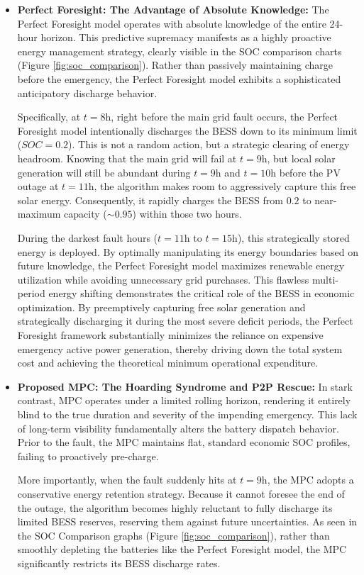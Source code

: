 \begin{itemize}
    \item \textbf{Perfect Foresight: The Advantage of Absolute Knowledge:}
The Perfect Foresight model operates with absolute knowledge of the entire 24-hour horizon. This predictive supremacy manifests as a highly proactive energy management strategy, clearly visible in the SOC comparison charts (Figure \ref{fig:soc_comparison}). Rather than passively maintaining charge before the emergency, the Perfect Foresight model exhibits a sophisticated anticipatory discharge behavior. 

Specifically, at $t=8\text{h}$, right before the main grid fault occurs, the Perfect Foresight model intentionally discharges the BESS down to its minimum limit ($SOC = 0.2$). This is not a random action, but a strategic clearing of energy headroom. Knowing that the main grid will fail at $t=9\text{h}$, but local solar generation will still be abundant during $t=9\text{h}$ and $t=10\text{h}$ before the PV outage at $t=11\text{h}$, the algorithm makes room to aggressively capture this free solar energy. Consequently, it rapidly charges the BESS from $0.2$ to near-maximum capacity ($\sim 0.95$) within those two hours.

During the darkest fault hours ($t=11\text{h}$ to $t=15\text{h}$), this strategically stored energy is deployed. By optimally manipulating its energy boundaries based on future knowledge, the Perfect Foresight model maximizes renewable energy utilization while avoiding unnecessary grid purchases. This flawless multi-period energy shifting demonstrates the critical role of the BESS in economic optimization. By preemptively capturing free solar generation and strategically discharging it during the most severe deficit periods, the Perfect Foresight framework substantially minimizes the reliance on expensive emergency active power generation, thereby driving down the total system cost and achieving the theoretical minimum operational expenditure.

    \item \textbf{Proposed MPC: The Hoarding Syndrome and P2P Rescue:}
In stark contrast, MPC operates under a limited rolling horizon, rendering it entirely blind to the true duration and severity of the impending emergency. This lack of long-term visibility fundamentally alters the battery dispatch behavior. Prior to the fault, the MPC maintains flat, standard economic SOC profiles, failing to proactively pre-charge. 

More importantly, when the fault suddenly hits at $t=9\text{h}$, the MPC adopts a conservative energy retention strategy. Because it cannot foresee the end of the outage, the algorithm becomes highly reluctant to fully discharge its limited BESS reserves, reserving them against future uncertainties. As seen in the SOC Comparison graphs (Figure \ref{fig:soc_comparison}), rather than smoothly depleting the batteries like the Perfect Foresight model, the MPC significantly restricts its BESS discharge rates. 


\end{itemize}
